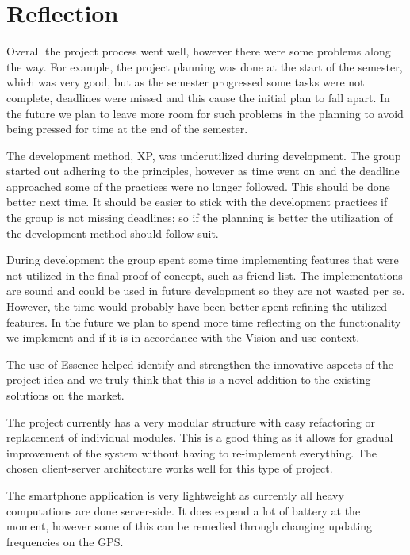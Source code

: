 \section{Reflection}
Overall the project process went well, however there were some problems along the way. For example, the project planning was done at the start of the semester, which was very good, but as the semester progressed some tasks were not complete, deadlines were missed and this cause the initial plan to fall apart. In the future we plan to leave more room for such problems in the planning to avoid being pressed for time at the end of the semester.

The development method, \ac{XP}, was underutilized during development. The group started out adhering to the principles, however as time went on and the deadline approached some of the practices were no longer followed. This should be done better next time. It should be easier to stick with the development practices if the group is not missing deadlines; so if the planning is better the utilization of the development method should follow suit.

During development the group spent some time implementing features that were not utilized in the final proof-of-concept, such as friend list. The implementations are sound and could be used in future development so they are not wasted per se. However, the time would probably have been better spent refining the utilized features. In the future we plan to spend more time reflecting on the functionality we implement and if it is in accordance with the Vision and use context.

The use of Essence helped identify and strengthen the innovative aspects of the project idea and we truly think that this is a novel addition to the existing solutions on the market.

The project currently has a very modular structure with easy refactoring or replacement of individual modules. This is a good thing as it allows for gradual improvement of the system without having to re-implement everything. The chosen client-server architecture works well for this type of project.

The smartphone application is very lightweight as currently all heavy computations are done server-side. It does expend a lot of battery at the moment, however some of this can be remedied through changing updating frequencies on the \ac{GPS}. 
